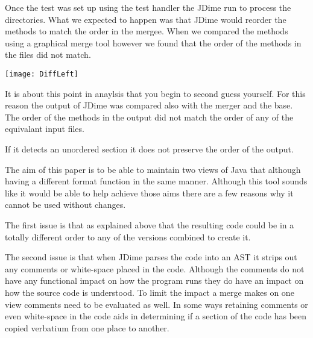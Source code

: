 Once the test was set up using the test handler the JDime run to process the directories.
What we expected to happen was that JDime would reorder the methods to match the order in the mergee. When we compared the methods using a graphical merge tool however we found that the order of the methods in the files did not match.

\begin{center}
\texttt{[image: DiffLeft]}
\end{center}

It is about this point in anaylsis that you begin to second guess yourself.  For this reason the output of JDime was compared also with the merger and the base.  The order of the methods in the output did not match the order of any of the equivalant input files.  

If it detects an unordered section it does not preserve the order of the output.

The aim of this paper is to be able to maintain two views of Java that although having a different format function in the same manner.  Although this tool sounds like it would be able to help achieve those aims there are a few reasons why it cannot be used without changes.

The first issue is that as explained above that the resulting code could be in a totally different order to any of the versions combined to create it.

The second issue is that when JDime parses the code into an AST it strips out any comments or white-space placed in the code.  Although the comments do not have any functional impact on how the program runs they do have an impact on how the source code is understood.  To limit the impact a merge makes on one view comments need to be evaluated as well. In some ways retaining comments or even white-space in the code aids in determining if a section of the code has been copied verbatium from one place to another. 





 







 
 


